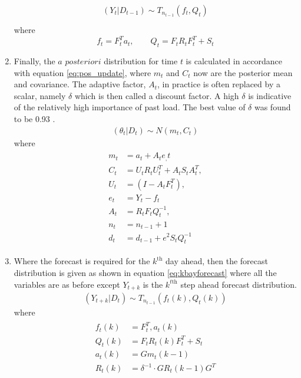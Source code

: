 \documentclass[a4paper]{article}
\begin{document}
\begin{enumerate}
\begin{align}
\begin{split}
(Y_t | D_{t-1}) \sim T_{n_{t-1}}(f_t,Q_t) \\
\end{split}
\end{align}
%
where
%
\begin{equation*}
f_t = F^T_t a_t, \qquad Q_t = F_t R_t F_t^T + S_t
\end{equation*}
%
\item Finally, the $a$ $posteriori$ distribution for time $t$ is calculated in accordance with equation \ref{eq:pos_update}, where $m_t$ and $C_t$ now are the posterior mean and covariance. The adaptive factor, $A_t$, in practice is often replaced by a scalar, namely $\delta$ which is then called a discount factor. A high $\delta$ is indicative of the relatively high importance of past load. The best value of $\delta$ was found to be 0.93 \citep{douglas98}.
%
\begin{align} \label{eq:pos_update}
(\theta_t|D_t) \sim N(m_t,C_t)
\end{align}
%
where
%
\begin{align*}
\begin{split}
m_t &= a_t + A_te_,t \\
C_t &= U_t R_t U_t^T + A_t S_t A_t^T, \\
U_t &= (I - A_tF_t^T), \\ 
e_t &= Y_t - f_t \\
A_t &= R_tF_tQ_t^{-1}, \\ 
n_t &= n_{t-1} + 1\\
d_t &= d_{t-1} + e^2S_tQ_t^{-1}
\end{split}
\end{align*}
%
\item Where the forecast is required for the $k^{\text{th}}$ day ahead, then the forecast distribution is given as shown in equation \ref{eq:kbayforecast} where all the variables are as before except $Y_{t+k}$ is the $k^{t\text{th}}$ step ahead forecast distribution.
%
\begin{align} \label{eq:kbayforecast}
(Y_{t+k}|D_t) \sim T_{n_{t-1}}(f_t(k),Q_t(k))
\end{align}
%
where
%
\begin{align*}
\begin{split}
f_t(k) &= F_t^T,a_t(k) \\
Q_t(k) &= F_t R_t(k) F_t^T + S_t \\
a_t(k) &= Gm_t(k-1) \\
R_t(k) &= \delta^{-1}\cdot GR_t(k-1)G^T
\end{split}
\end{align*}
%
\end{enumerate}
\end{document}
